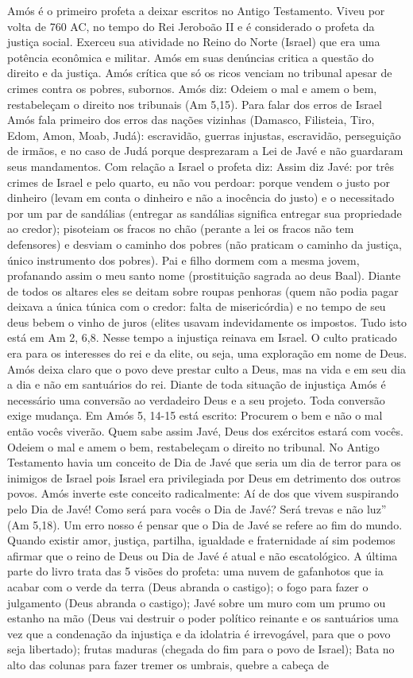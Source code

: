 \documentclass[
]{book}
\begin{document}
Amós é o primeiro profeta a deixar escritos no Antigo Testamento. Viveu por volta de 760 AC, no tempo do Rei Jeroboão II e é considerado o profeta da justiça social. Exerceu sua atividade no Reino do Norte (Israel) que era uma potência econômica e militar. Amós em suas denúncias critica a questão do direito e da justiça. Amós crítica que só os ricos venciam no tribunal apesar de crimes contra os pobres, subornos. Amós diz: Odeiem o mal e amem o bem, restabeleçam o direito nos tribunais (Am 5,15). Para falar dos erros de Israel Amós fala primeiro dos erros das nações vizinhas (Damasco, Filisteia, Tiro, Edom, Amon, Moab, Judá): escravidão, guerras injustas, escravidão, perseguição de irmãos, e no caso de Judá porque desprezaram a Lei de Javé e não guardaram seus mandamentos. Com relação a Israel o profeta diz: Assim diz Javé: por três crimes de Israel e pelo quarto, eu não vou perdoar: porque vendem o justo por dinheiro (levam em conta o dinheiro e não a inocência do justo) e o necessitado por um par de sandálias (entregar as sandálias significa entregar sua propriedade ao credor); pisoteiam os fracos no chão (perante a lei os fracos não tem defensores) e desviam o caminho dos pobres (não praticam o caminho da justiça, único instrumento dos pobres). Pai e filho dormem com a mesma jovem, profanando assim o meu santo nome (prostituição sagrada ao deus Baal). Diante de todos os altares eles se deitam sobre roupas penhoras (quem não podia pagar deixava a única túnica com o credor: falta de misericórdia) e no tempo de seu deus bebem o vinho de juros (elites usavam indevidamente os impostos. Tudo isto está em Am 2, 6,8. Nesse tempo a injustiça reinava em Israel. O culto praticado era para os interesses do rei e da elite, ou seja, uma exploração em nome de Deus. Amós deixa claro que o povo deve prestar culto a Deus, mas na vida e em seu dia a dia e não em santuários do rei. Diante de toda situação de injustiça Amós é necessário uma conversão ao verdadeiro Deus e a seu projeto. Toda conversão exige mudança. Em Amós 5, 14-15 está escrito: Procurem o bem e não o mal então vocês viverão. Quem sabe assim Javé, Deus dos exércitos estará com vocês. Odeiem o mal e amem o bem, restabeleçam o direito no tribunal. No Antigo Testamento havia um conceito de Dia de Javé que seria um dia de terror para os inimigos de Israel pois Israel era privilegiada por Deus em detrimento dos outros povos. Amós inverte este conceito radicalmente: Aí de dos que vivem suspirando pelo Dia de Javé! Como será para vocês o Dia de Javé? Será trevas e não luz'' (Am 5,18). Um erro nosso é pensar que o Dia de Javé se refere ao fim do mundo. Quando existir amor, justiça, partilha, igualdade e fraternidade aí sim podemos afirmar que o reino de Deus ou Dia de Javé é atual e não escatológico. A última parte do livro trata das 5 visões do profeta: uma nuvem de gafanhotos que ia acabar com o verde da terra (Deus abranda o castigo); o fogo para fazer o julgamento (Deus abranda o castigo); Javé sobre um muro com um prumo ou estanho na mão (Deus vai destruir o poder político reinante e os santuários uma vez que a condenação da injustiça e da idolatria é irrevogável, para que o povo seja libertado); frutas maduras (chegada do fim para o povo de Israel); Bata no alto das colunas para fazer tremer os umbrais, quebre a cabeça de 
\end{document}

